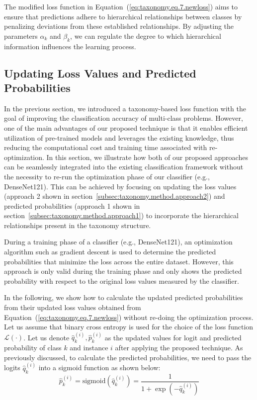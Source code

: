 The modified loss function in Equation~(\ref{eq:taxonomy.eq.7.newloss}) aims to ensure that predictions adhere to hierarchical relationships between classes by penalizing deviations from these established relationships. By adjusting the parameters $\alpha_k $ and $\beta_k $, we can regulate the degree to which hierarchical information influences the learning process.

\subsection{Updating Loss Values and Predicted Probabilities}\label{subsec:updating-loss-values-and-predicted-probabilities}

In the previous section, we introduced a taxonomy-based loss function with the goal of improving the classification accuracy of multi-class problems. However, one of the main advantages of our proposed technique is that it enables efficient utilization of pre-trained models and leverages the existing knowledge, thus reducing the computational cost and training time associated with re-optimization. In this section, we illustrate how both of our proposed approaches can be seamlessly integrated into the existing classification framework without the necessity to re-run the optimization phase of our classifier (e.g., DenseNet121). This can be achieved by focusing on updating the loss values (approach 2 shown in section~\ref{subsec:taxonomy.method.approach2}) and predicted probabilities (approach 1 shown in section~\ref{subsec:taxonomy.method.approach1}) to incorporate the hierarchical relationships present in the taxonomy structure.

During a training phase of a classifier (e.g., DenseNet121), an optimization algorithm such as gradient descent is used to determine the predicted probabilities that minimize the loss across the entire dataset. However, this approach is only valid during the training phase and only shows the predicted probability with respect to the original loss values measured by the classifier.

In the following, we show how to calculate the updated predicted probabilities from their updated loss values obtained from Equation~(\ref{eq:taxonomy.eq.7.newloss}) without re-doing the optimization process. Let us assume that binary cross entropy is used for the choice of the loss function $\mathcal{L}(\cdot) $. Let us denote $\widehat{q}_k^{(i)} , \widehat{p}_k^{(i)} $ as the updated values for logit and predicted probability of class $k $ and instance $i $ after applying the proposed technique. As previously discussed, to calculate the predicted probabilities, we need to pass the logits ${\widehat q}_k^{(i)} $ into a sigmoid function as shown below:
\begin{equation}
    \label{eq:taxonomy.eq.9.sigmoid}
    \widehat{p}_k^{(i)}=\text{sigmoid}\left(\widehat{q}_k^{(i)}\right)=\frac1{1+\exp\left(-\widehat{q}_k^{(i)}\right)}
\end{equation}

